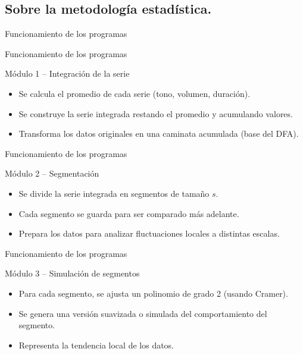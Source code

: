 \documentclass[11pt]{beamer}
\begin{document}
\subsection{Sobre la metodología estadística.}
\begin{frame}{Funcionamiento de los programas}

\end{frame}

\begin{frame}{Funcionamiento de los programas}
\begin{block}{Módulo 1 – Integración de la serie}
\begin{itemize}
    \item Se calcula el promedio de cada serie (tono, volumen, duración).
    \item Se construye la serie integrada restando el promedio y acumulando valores.
    \item Transforma los datos originales en una caminata acumulada (base del DFA).
\end{itemize}
\end{block}
\end{frame}

\begin{frame}{Funcionamiento de los programas}
\begin{block}{Módulo 2 – Segmentación}
\begin{itemize}
    \item Se divide la serie integrada en segmentos de tamaño $s$.
    \item Cada segmento se guarda para ser comparado más adelante.
    \item Prepara los datos para analizar fluctuaciones locales a distintas escalas.
\end{itemize}
\end{block}
\end{frame}

\begin{frame}{Funcionamiento de los programas}
\begin{block}{Módulo 3 – Simulación de segmentos}
\begin{itemize}
    \item Para cada segmento, se ajusta un polinomio de grado 2 (usando Cramer).
    \item Se genera una versión suavizada o simulada del comportamiento del segmento.
    \item Representa la tendencia local de los datos.
\end{itemize}
\end{block}
\end{frame}
\end{document}
